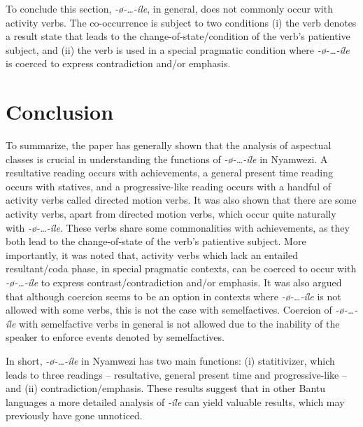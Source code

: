 \documentclass[output=paper,newtxmath,modfonts,nonflat,draftmode]{langsci/langscibook}
\begin{document}
To conclude this section, \textit{-ø-…-íle}, in general, does not commonly occur with activity verbs. The co-occurrence is subject to two conditions (i) the verb denotes a result state that leads to the change-of-state/condition of the verb’s patientive subject, and (ii) the verb is used in a special pragmatic condition where \textit{-ø-…-íle} is coerced to express contradiction and/or emphasis.

\section{Conclusion}\label{sec:kanijo:5}\largerpage[-2]

To summarize, the paper has generally shown that the analysis of aspectual classes is crucial in understanding the functions of \textit{-ø-…-íle} in Nyamwezi. A resultative reading occurs with achievements, a general present time reading occurs with statives, and a progressive-like reading occurs with a handful of activity verbs called directed motion verbs. It was also shown that there are some activity verbs, apart from directed motion verbs, which occur quite naturally with \textit{-ø-…-íle}. These verbs share some commonalities with achievements, as they both lead to the change-of-state of the verb’s patientive subject. More importantly, it was noted that, activity verbs which lack an entailed resultant/coda phase, in special pragmatic contexts, can be coerced to occur with \textit{-ø-…-íle} to express contrast/contradiction and/or emphasis. It was also argued that although coercion seems to be an option in contexts where \textit{-ø-…-íle} is not allowed with some verbs, this is not the case with semelfactives. Coercion of \textit{-ø-…-íle} with semelfactive verbs in general is not allowed due to the inability of the speaker to enforce events denoted by semelfactives. 

In short, \textit{-ø-…-íle} in Nyamwezi has two main functions: (i) statitivizer, which leads to three readings -- resultative, general present time and progressive-like -- and (ii) contradiction/emphasis. These results suggest that in other Bantu languages a more detailed analysis of \textit{-íle} can yield valuable results, which may previously have gone unnoticed.  

\end{document}
